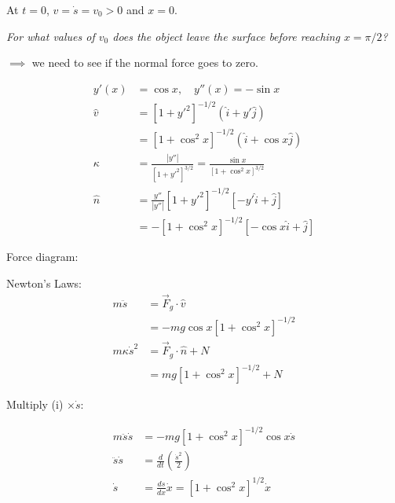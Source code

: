 \documentclass[10pt]{scrartcl}
\begin{document}
\begin{example}
At $t = 0$, $v = \dot{s} = v_0 > 0$ and $x = 0$. 

\emph{For what values of $v_0$ does the object leave the surface before reaching $x = \pi/2$?}

$\implies$ we need to see if the normal force goes to zero. 

\[
\begin{aligned}
  y'(x) &= \cos x, \quad y''(x) = -\sin x\\[0.2cm]
  \hat{v} &= [1+y'^2]^{-1/2}(\hat{i} + y'\hat{j})\\
  &= [1+\cos^2x]^{-1/2}(\hat{i} + \cos x\hat{j})\\[0.2cm]
  \kappa &= \frac{|y''|}{[1+y'^2]^{3/2}} = \frac{\sin x}{[1 + \cos^2x]^{3/2}}\\[0.2cm]
  \hat{n} &= \frac{y''}{|y''|}[1 + y'^2]^{-1/2}[-y'\hat{i} + \hat{j}]\\
  &= -[1+\cos^2x]^{-1/2}[-\cos x \hat{i} + \hat{j}]
\end{aligned}
\]

Force diagram: 
\begin{center}
\end{center}


Newton's Laws: 
\begin{align*}
  m\ddot{s} &= \vec{F}_g \cdot\hat{v}\\
  &= -mg\cos x [1+\cos^2x]^{-1/2} \tag{i}\\
  m\kappa \dot{s}^2 &= \vec{F}_g\cdot\hat{n} + N\\
  &= mg[1 + \cos^2x]^{-1/2} + N \tag{ii}
\end{align*}

Multiply (i) $\times \dot{s}$:

\[
\begin{aligned}
  m\ddot{s}\dot{s} &= -mg[1+\cos^2x]^{-1/2}\cos x \dot{s}\\
  \ddot{s}\dot{s} &= \frac{d}{dt}\left(\frac{\dot{s}^2}{2}\right)\\
  \dot{s} &= \frac{ds}{dx}\dot{x} = [1 + \cos^2x]^{1/2}\dot{x}
\end{aligned}
\]


\end{example}
\end{document}

